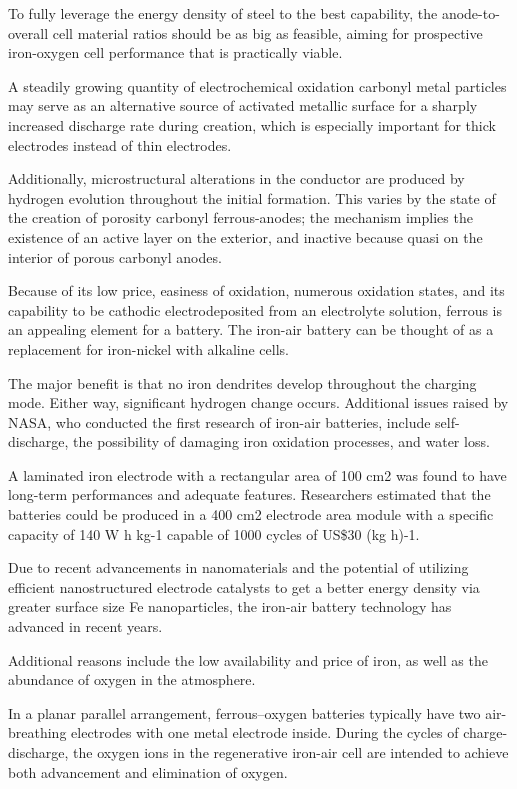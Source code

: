 \documentclass[
]{book}
\begin{document}
To fully leverage the energy density of steel to the best capability, the anode-to-overall cell material ratios should be as big as feasible, aiming for prospective iron-oxygen cell performance that is practically viable.

A steadily growing quantity of electrochemical oxidation carbonyl metal particles may serve as an alternative source of activated metallic surface for a sharply increased discharge rate during creation, which is especially important for thick electrodes instead of thin electrodes.

Additionally, microstructural alterations in the conductor are produced by hydrogen evolution throughout the initial formation. This varies by the state of the creation of porosity carbonyl ferrous-anodes; the mechanism implies the existence of an active layer on the exterior, and inactive because quasi on the interior of porous carbonyl anodes.

Because of its low price, easiness of oxidation, numerous oxidation states, and its capability to be cathodic electrodeposited from an electrolyte solution, ferrous is an appealing element for a battery. The iron-air battery can be thought of as a replacement for iron-nickel with alkaline cells.

The major benefit is that no iron dendrites develop throughout the charging mode. Either way, significant hydrogen change occurs. Additional issues raised by NASA, who conducted the first research of iron-air batteries, include self-discharge, the possibility of damaging iron oxidation processes, and water loss.

A laminated iron electrode with a rectangular area of 100 cm2 was found to have long-term performances and adequate features. Researchers estimated that the batteries could be produced in a 400 cm2 electrode area module with a specific capacity of 140 W h kg-1 capable of 1000 cycles of US\$30 (kg h)-1.

Due to recent advancements in nanomaterials and the potential of utilizing efficient nanostructured electrode catalysts to get a better energy density via greater surface size Fe nanoparticles, the iron-air battery technology has advanced in recent years.

Additional reasons include the low availability and price of iron, as well as the abundance of oxygen in the atmosphere.

In a planar parallel arrangement, ferrous--oxygen batteries typically have two air-breathing electrodes with one metal electrode inside. During the cycles of charge-discharge, the oxygen ions in the regenerative iron-air cell are intended to achieve both advancement and elimination of oxygen.
\end{document}
